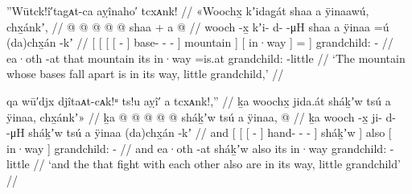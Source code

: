 \ex\label{ex:92-91-mountain-in-way}%
%
\begingl
	\glpreamble	”Wūtck!î′tagᴀt-ca aỵînaho′ tcxᴀnk! //
	\glpreamble	«\!Woochx̱ kʼidag̱át shaa a ÿinaawú, chx̱ánkʼ, //
	\gla	{} {} {} {}  @ {} {}
			 @ {} @ {} @ {} @ {} {}
			shaa {} +
		{} a  {} {} {}
		 @ {} //
	\glb	{} {} {} {} wooch -x̱ {}
			kʼi- d-  -μH {} {}
			shaa {}
		{} a ÿinaa {} =ú {}
		(da)chx̱án -kʼ //
	\glc	{}[ {}[ {}[ {}[  - {}]
			base- -  - \· {}]
			mountain {}]
		{}[  in·way {}] = {}]
		grandchild: - //
	\gld	{} {} {} {} ea·oth -at {}
			 {} {} {} \·that {}
			mountain {}
		{} its in·way {} =is.at {}
		grandchild: -little //
	\glft	‘The mountain whose bases fall apart is in its way, little grandchild,’
		//
\endgl
\xe


\ex\label{ex:92-92-also-shakhw-in-way}%
%
\begingl
	\glpreamble	qa wū′djx djîtaᴀt-cᴀk!ᵘ ts!u aỵî′ a tcxᴀnk!,” //
	\glpreamble	ḵa woochx̱ jida.át sháḵʼw tsú a ÿinaa, chx̱ánkʼ\!» //
	\gla	ḵa {} {} {}  @ {} {}  @ {} @ {} @ {} @ {} {}
			sháḵʼw {} tsú
		{} a ÿinaa, {}
		 @ {} //
	\glb	ḵa {} {} {} wooch -x̱ {}
			ji- d-  -μH {} {}
			sháḵʼw {} tsú
		{} a ÿinaa {}
		(da)chx̱án -kʼ //
	\glc	and {}[ {}[ {}[  - {}]
			hand- -  - \· {}]
			sháḵʼw {}] also
		{}[  in·way {}]
		grandchild: - //
	\gld	and {} {} {} ea·oth -at {}  {} {} {} {} {}
			sháḵʼw {} also
		{} its in·way {}
		grandchild: -little //
	\glft	‘and the  that fight with each other also are in its way, little grandchild’
		//
\endgl
\xe


